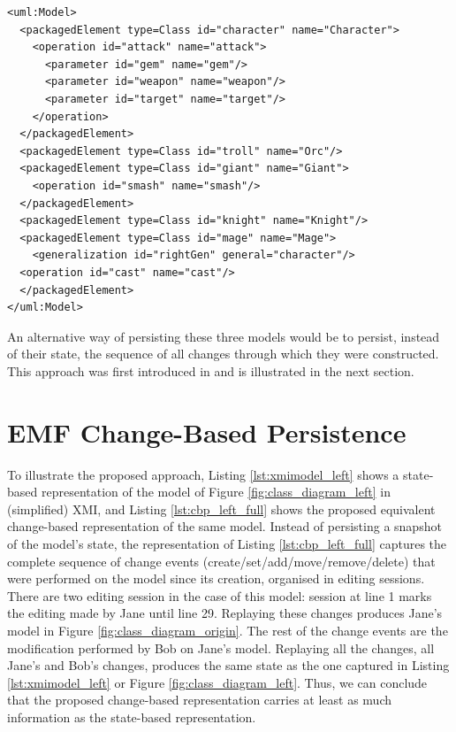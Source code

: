 \vspace{-20pt}
\begin{lstlisting}[style=xmi,caption={Simplified XMI file of the right version of Figure \ref{fig:class_diagram_right}.},label=lst:xmimodel_right]
<uml:Model>
  <packagedElement type=Class id="character" name="Character">
    <operation id="attack" name="attack">
      <parameter id="gem" name="gem"/>
      <parameter id="weapon" name="weapon"/>
      <parameter id="target" name="target"/>
    </operation>
  </packagedElement>
  <packagedElement type=Class id="troll" name="Orc"/>
  <packagedElement type=Class id="giant" name="Giant">
    <operation id="smash" name="smash"/>
  </packagedElement>
  <packagedElement type=Class id="knight" name="Knight"/>
  <packagedElement type=Class id="mage" name="Mage">
    <generalization id="rightGen" general="character"/>
  <operation id="cast" name="cast"/>
  </packagedElement>
</uml:Model>
\end{lstlisting}

An alternative way of persisting these three models would be to persist, instead of their state, the sequence of all changes through which they were constructed. This approach was first introduced in \cite{DBLP:conf/models/YohannisKP17} and is illustrated in the next section.


\section{EMF Change-Based Persistence}
\label{sec:emf_change_based_persistence}

To illustrate the proposed approach, Listing \ref{lst:xmimodel_left} shows a state-based representation of the model of Figure \ref{fig:class_diagram_left} in (simplified) XMI, and Listing \ref{lst:cbp_left_full} shows the proposed equivalent change-based representation of the same model. Instead of persisting a snapshot of the model's state, the representation of Listing \ref{lst:cbp_left_full} captures the complete sequence of change events (create/set/add/move/remove/delete) that were performed on the model since its creation, organised in editing sessions. There are two editing session in the case of this model: session at line 1 marks the editing made by Jane until line 29. Replaying these changes produces Jane's model in Figure \ref{fig:class_diagram_origin}. The rest of the change events are the modification performed by Bob on Jane's model. Replaying all the changes, all Jane's and Bob's changes, produces the same state as the one captured in Listing \ref{lst:xmimodel_left} or Figure \ref{fig:class_diagram_left}. Thus, we can conclude that the proposed change-based representation carries at least as much information as the state-based representation. 


